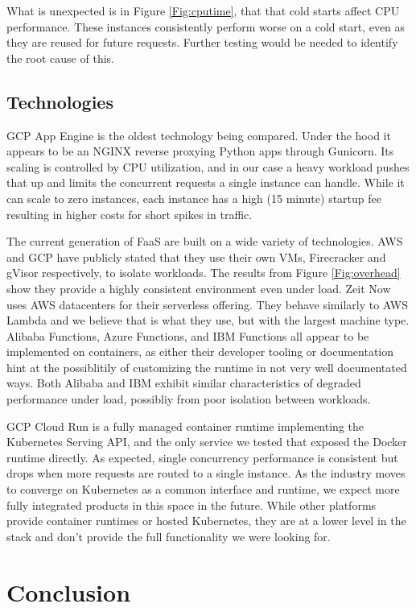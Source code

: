 \documentclass[11pt]{article}
\begin{document}
What is unexpected is in Figure \ref{Fig:cputime},
that that cold starts affect CPU performance.
These instances consistently perform worse on a cold start,
even as they are reused for future requests.
Further testing would be needed to identify the root cause of this.

\subsection{Technologies}
GCP App Engine is the oldest technology being compared.
Under the hood it appears to be an NGINX reverse proxying Python apps through Gunicorn.
Its scaling is controlled by CPU utilization,
and in our case a heavy workload pushes that up
and limits the concurrent requests a single instance can handle.
While it can scale to zero instances,
each instance has a high (15 minute) startup fee \cite{gcp}
resulting in higher costs for short spikes in traffic.

The current generation of FaaS are built on a wide variety of technologies.
AWS and GCP have publicly stated that they use their own VMs,
Firecracker and gVisor respectively, to isolate workloads.
The results from Figure \ref{Fig:overhead}
show they provide a highly consistent environment even under load.
Zeit Now uses AWS datacenters \cite{zn}
for their serverless offering.
They behave similarly to AWS Lambda
and we believe that is what they use, but with the largest machine type.
Alibaba Functions, Azure Functions, and IBM Functions
all appear to be implemented on containers,
as either their developer tooling or documentation
hint at the possiblitily of customizing the runtime in not very well documentated ways.
Both Alibaba and IBM exhibit similar characteristics of degraded performance under load,
possibliy from poor isolation between workloads.

GCP Cloud Run is a fully managed container runtime implementing the Kubernetes Serving API,
and the only service we tested that exposed the Docker runtime directly.
As expected, single concurrency performance is consistent
but drops when more requests are routed to a single instance.
As the industry moves to converge on Kubernetes as a common interface and runtime,
we expect more fully integrated products in this space in the future.
While other platforms provide container runtimes or hosted Kubernetes,
they are at a lower level in the stack and don't provide the full functionality we were looking for.




\section{Conclusion}
\end{document}
